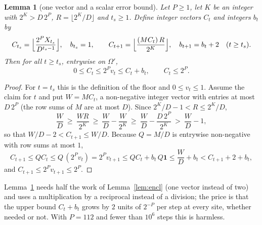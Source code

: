\documentclass[11pt,a4paper]{article}
\newtheorem{lemma}[theorem]{Lemma}
\theoremstyle{definition}
\theoremstyle{remark}
\begin{document}
\begin{lemma}[one vector and a scalar error bound]\label{lem:single}
Let $P\ge1$, let $K$ be an integer with $2^K>D\,2^P$, $R=\lfloor 2^K/D\rfloor$ and $t_s\ge1$. Define integer vectors $C_t$ and integers $b_t$ by
\[
C_{t_s}=\Bigl\lfloor \frac{2^PX_{t_s}}{D^{t_s-1}}\Bigr\rfloor,\quad b_{t_s}=1,\qquad
C_{t+1}=\Bigl\lfloor\frac{(MC_t)\,R}{2^K}\Bigr\rfloor,\quad b_{t+1}=b_t+2\quad(t\ge t_s).
\]
Then for all $t\ge t_s$, entrywise on $\Omega'$,
\[
0\le C_t\le 2^Pv_t\le C_t+b_t,\qquad C_t\le 2^P .
\]
\end{lemma}
\begin{proof}
For $t=t_s$ this is the definition of the floor and $0\le v_t\le 1$. Assume the claim for $t$ and put $W=MC_t$, a non-negative integer vector with entries at most $D\,2^P$ (the row sums of $M$ are at most $D$). Since $2^K/D-1<R\le 2^K/D$,
\[
\frac WD\ \ge\ \frac{WR}{2^K}\ \ge\ \frac WD-\frac{W}{2^K}\ \ge\ \frac WD-\frac{D\,2^P}{2^K}\ >\ \frac WD-1,
\]
so that $W/D-2<C_{t+1}\le W/D$. Because $Q=M/D$ is entrywise non-negative with row sums at most $1$,
\[
C_{t+1}\le QC_t\le Q\,(2^Pv_t)=2^Pv_{t+1}\le QC_t+b_t\,Q\mathbf 1\le \frac WD+b_t< C_{t+1}+2+b_t ,
\]
and $C_{t+1}\le2^Pv_{t+1}\le2^P$.
\end{proof}

Lemma~\ref{lem:single} needs half the work of Lemma~\ref{lem:encl} (one vector instead of two) and uses a multiplication by a reciprocal instead of a division; the price is that the upper bound $C_t+b_t$ grows by $2$ units of $2^{-P}$ per step at every site, whether needed or not. With $P=112$ and fewer than $10^6$ steps this is harmless.
\end{document}

